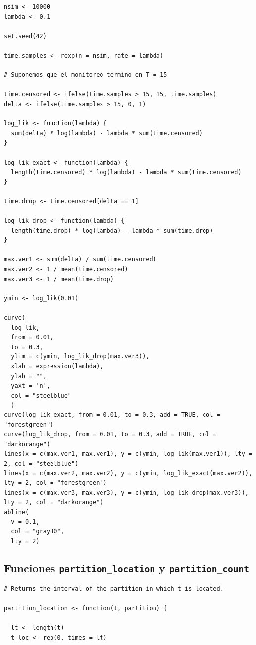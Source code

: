 \documentclass[11pt,a4paper]{article}
\begin{document}
\begin{appendices}
\begin{lstlisting}
nsim <- 10000
lambda <- 0.1

set.seed(42)

time.samples <- rexp(n = nsim, rate = lambda)

# Suponemos que el monitoreo termino en T = 15

time.censored <- ifelse(time.samples > 15, 15, time.samples)
delta <- ifelse(time.samples > 15, 0, 1)

log_lik <- function(lambda) {
  sum(delta) * log(lambda) - lambda * sum(time.censored)
}

log_lik_exact <- function(lambda) {
  length(time.censored) * log(lambda) - lambda * sum(time.censored)
}

time.drop <- time.censored[delta == 1]

log_lik_drop <- function(lambda) {
  length(time.drop) * log(lambda) - lambda * sum(time.drop)
}

max.ver1 <- sum(delta) / sum(time.censored)
max.ver2 <- 1 / mean(time.censored)
max.ver3 <- 1 / mean(time.drop)

ymin <- log_lik(0.01)

curve(
  log_lik,
  from = 0.01,
  to = 0.3,
  ylim = c(ymin, log_lik_drop(max.ver3)),
  xlab = expression(lambda),
  ylab = "",
  yaxt = 'n',
  col = "steelblue"
  )
curve(log_lik_exact, from = 0.01, to = 0.3, add = TRUE, col = "forestgreen")
curve(log_lik_drop, from = 0.01, to = 0.3, add = TRUE, col = "darkorange")
lines(x = c(max.ver1, max.ver1), y = c(ymin, log_lik(max.ver1)), lty = 2, col = "steelblue")
lines(x = c(max.ver2, max.ver2), y = c(ymin, log_lik_exact(max.ver2)), lty = 2, col = "forestgreen")
lines(x = c(max.ver3, max.ver3), y = c(ymin, log_lik_drop(max.ver3)), lty = 2, col = "darkorange")
abline(
  v = 0.1,
  col = "gray80",
  lty = 2)
\end{lstlisting}

\newpage

\subsection{Funciones \texttt{partition\_location} y \texttt{partition\_count}}
\label{ap:partition_functions}

\begin{lstlisting}
# Returns the interval of the partition in which t is located.

partition_location <- function(t, partition) {

  lt <- length(t)
  t_loc <- rep(0, times = lt)


\end{lstlisting}
\end{appendices}
\end{document}
